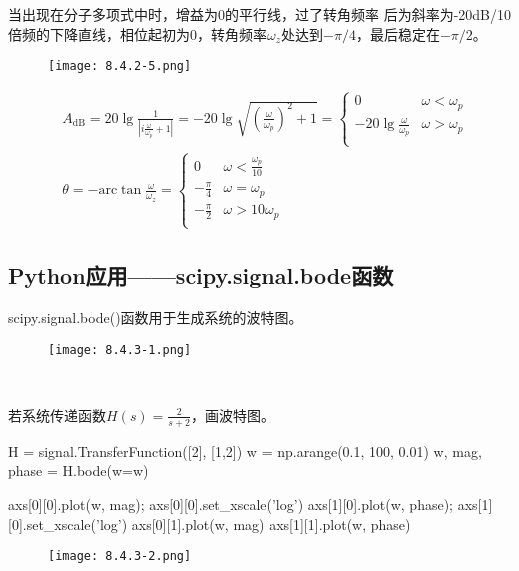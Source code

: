当出现在分子多项式中时，增益为0的平行线，过了转角频率 后为斜率为-20dB/10倍频的下降直线，相位起初为0，转角频率$\omega _z$处达到$-\pi /4$，最后稳定在$-\pi /2$。
\begin{figure}[ht]
\centering
\texttt{[image: 8.4.2-5.png]}
\end{figure}
\begin{align*}
&A_{\mathrm{dB}}=20\lg \frac{1}{\left| i\frac{\omega}{\omega _p}+1 \right|}=-20\lg \sqrt{\left( \frac{\omega}{\omega _p} \right) ^2+1}=\begin{cases}
	0 &\omega <\omega _p\\
	-20\lg \frac{\omega}{\omega _p} &\omega >\omega _p\\
\end{cases} \\
&\theta =-\mathrm{arc}\tan \frac{\omega}{\omega _z}=\begin{cases}
	0 &\omega <\frac{\omega _p}{10}\\
	-\frac{\pi}{4} &\omega =\omega _p\\
	-\frac{\pi}{2} &\omega >10\omega _p\\
\end{cases}
\end{align*}

\subsection{Python应用——scipy.signal.bode函数}

scipy.signal.bode()函数用于生成系统的波特图。
\begin{figure}[h]
\centering
\texttt{[image: 8.4.3-1.png]}
\end{figure}

~

\begin{example}
若系统传递函数$H\left( s \right) =\frac{2}{s+2}$，画波特图。
\end{example}

\begin{python}
H = signal.TransferFunction([2], [1,2])
w = np.arange(0.1, 100, 0.01)
w, mag, phase = H.bode(w=w)

axs[0][0].plot(w, mag);   axs[0][0].set_xscale('log')
axs[1][0].plot(w, phase); axs[1][0].set_xscale('log')
axs[0][1].plot(w, mag)
axs[1][1].plot(w, phase)
\end{python}

\begin{figure}[h]
\centering
\texttt{[image: 8.4.3-2.png]}
\end{figure}




